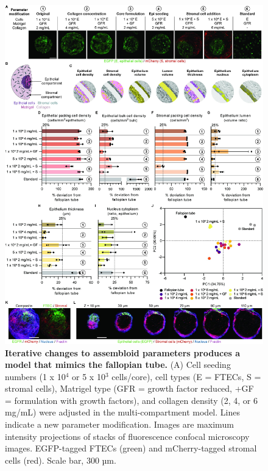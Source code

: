 \begin{refsection}
    \begin{figure}[p]
        \begin{center}
            \includegraphics[width=1\textwidth,height=0.85\textheight,keepaspectratio,clip,page=1]{figures/chapter4/fig_6.jpg}
            \captionsetup{font=small}
            \caption{\textbf{Iterative changes to assembloid parameters produces a model that mimics the fallopian tube.} (A) Cell seeding numbers (1 x 10$^4$ or 5 x 10$^3$ cells/core), cell types (E = FTECs, S = stromal cells), Matrigel type (GFR = growth factor reduced, +GF = formulation with growth factors), and collagen density (2, 4, or 6 mg/mL) were adjusted in the multi-compartment model. Lines indicate a new parameter modification. Images are maximum intensity projections of stacks of fluorescence confocal microscopy images. EGFP-tagged FTECs (green) and mCherry-tagged stromal cells (red). Scale bar, 300 µm.}
            \label{chapter4_fig6}
        \end{center}
    \end{figure}
    

\end{refsection}
